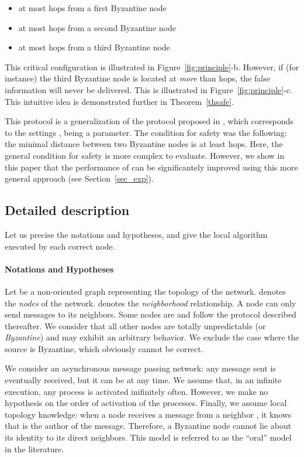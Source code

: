 \documentclass[a4paper,11pt]{article}
\begin{document}
\begin{itemize}
\item at most  hops from a first Byzantine node
\item at most  hops from a second Byzantine node
\item at most  hops from a third Byzantine node
\end{itemize}

This critical configuration is illustrated in Figure~\ref{fig:principle}-b. However, if (for instance) the third Byzantine node is located at \emph{more} than  hops, the false information will never be delivered. This is illustrated in Figure~\ref{fig:principle}-c. This intuitive idea is demonstrated further in Theorem~\ref{thsafe}.

This protocol is a generalization of the protocol proposed in \cite{Trig}, which corresponds to the settings ,  being a parameter. The condition for safety was the following: the minimal distance between two Byzantine nodes is at least  hops. Here, the general condition for safety is more complex to evaluate. However, we show in this paper that the performance of \cite{Trig} can be significantely improved using this more general approach (see Section~\ref{sec_exp}).

\subsection{Detailed description}

Let us precise the notations and hypotheses, and give the local algorithm executed by each correct node.

\paragraph{Notations and Hypotheses}

Let  be a non-oriented graph representing the topology of the network.  denotes the \emph{nodes} of the network.  denotes the \emph{neighborhood} relationship. A node can only send messages to its neighbors. Some nodes are  and follow the protocol described thereafter. We consider that all other nodes are totally unpredictable (or \emph{Byzantine}) and may exhibit an arbitrary behavior.
We exclude the case where the source is Byzantine, which obviously cannot be correct.

We consider an asynchronous message passing network: any message sent is eventually received, but it can be at any time. We assume that, in an infinite execution, any process is activated inifinitely often. However, we make no hypothesis on the order of activation of the processes. Finally, we assume local topology knowledge: when a node receives a message from a neighbor , it knows that  is the author of the message. Therefore, a Byzantine node cannot lie about its identity to its direct neighbors. This model is referred to as the ``oral'' model in the literature.
\end{document}
